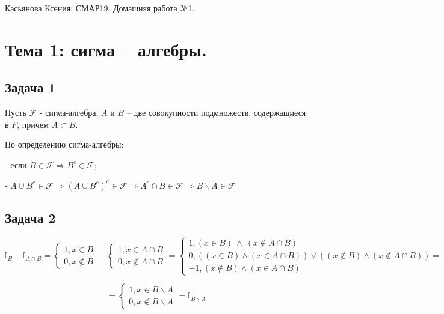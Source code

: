 \documentclass[a4paper,12pt]{article} %
\begin{document}
{ Касьянова Ксения, СМАР19. Домашняя работа №1. }

\noindent\makebox[\linewidth]{\rule{\textwidth}{0.4pt}}


\section*{Тема 1: сигма – алгебры.}
\subsection*{Задача 1}

Пусть $\mathcal{F}$ - сигма-алгебра, $A$ и $B$ – две совокупности
подмножеств, содержащиеся в $F$, причем $A \subset B$.

По определению сигма-алгебры:

- если $B \in  \mathcal{F} \Rightarrow B^c \in  \mathcal{F} $; 

- $A \cup B^c \in \mathcal{F}  \Rightarrow  (A \cup B^c)^c \in \mathcal{F}  \Rightarrow  A^c \cap B \in \mathcal{F} \Rightarrow  B\backslash A \in \mathcal{F}  $ 

\subsection*{Задача 2}

\begin{equation}\label{key}
\mathbb{I}_{B} - \mathbb{I}_{A \cap B} = \begin{cases} 1,  x \in B \\0,  x \notin B   
\end{cases} - \begin{cases} 1,  x \in A \cap B \\0,  x \notin A \cap B   
\end{cases}  = \begin{cases} 1,  (x \in B) \  \wedge \  (x \notin A \cap B)  \\0, ((x \in B)  \wedge  (x \in A \cap B )  ) \vee ( (x \notin B ) \wedge  (x \notin A \cap B )  ) = \\ -1, (x \notin B ) \wedge (x \in A \cap B ) 
\end{cases}  
\end{equation}

\begin{equation}\label{key}
 = \begin{cases} 1,  x \in B\backslash A \\0,  x \notin B\backslash A 
\end{cases}  = \mathbb{I}_{B\backslash A}
\end{equation}
\end{document}
